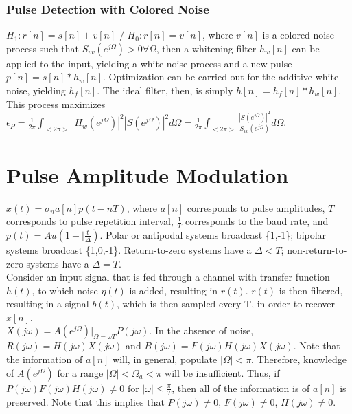 \documentclass[8pt]{extarticle}
\begin{document}
\begin{multicols*}{3}
\begin{center}
\subsubsection{Pulse Detection with Colored Noise}
\( H_1: r[n] = s[n] + v[n]\text{ / }H_0: r[n] = v[n] \), where \( v[n] \) is a colored noise process such that \( S_{vv}(e^{j\Omega}) > 0 \forall \Omega \), then a whitening filter \( h_w[n] \) can be applied to the input, yielding a white noise process and a new pulse \( p[n] = s[n] * h_w[n] \). Optimization can be carried out for the additive white noise, yielding \( h_f[n] \). The ideal filter, then, is simply \( h[n] = h_f[n] * h_w[n] \). This process maximizes \( \epsilon_P = \frac{1}{2\pi}\int_{<2\pi>} |H_w(e^{j\Omega})|^2 |S(e^{j\Omega})|^2 d\Omega = \frac{1}{2\pi} \int_{<2\pi>} \frac{|S(e^{j\Omega})|^2}{S_{vv}(e^{j\Omega})} d\Omega \).

\section{Pulse Amplitude Modulation}
\( x(t) = \sigma_n a[n] p(t-nT) \), where \( a[n] \) corresponds to pulse amplitudes, \( T \) corresponds to pulse repetition interval, \( \frac{1}{T} \) corresponds to the baud rate, and \( p(t) = A u(1-|\frac{t}{\Delta}) \). Polar or antipodal systems broadcast \{1,-1\}; bipolar systems broadcast \{1,0,-1\}. Return-to-zero systems have a \( \Delta < T \); non-return-to-zero systems have a \( \Delta = T \). \\

Consider an input signal that is fed through a channel with transfer function \( h(t) \), to which noise \( \eta(t) \) is added, resulting in \( r(t) \). \( r(t) \) is then filtered, resulting in a signal \( b(t) \), which is then sampled every T, in order to recover \( x[n] \). \\

\( X(j\omega) = A(e^{j\Omega})|_{\Omega = \omega T} P(j\omega) \). In the absence of noise, \( R(j\omega) = H(j\omega)X(j\omega) \) and \( B(j\omega) = F(j\omega)H(j\omega)X(j\omega) \). Note that the information of \( a[n] \) will, in general, populate \( |\Omega| < \pi \). Therefore, knowledge of \( A(e^{j\Omega}) \) for a range \( |\Omega| < \Omega_a < \pi \) will be insufficient. Thus, if \( P(j\omega)F(j\omega)H(j\omega) \neq 0 \text{ for } |\omega| \leq \frac{\pi}{T} \), then all of the information is of \( a[n] \) is preserved. Note that this implies that \( P(j\omega) \neq 0 \), \( F(j\omega) \neq 0 \), \( H(j\omega) \neq 0 \).


\end{center}
\end{multicols*}
\end{document}
